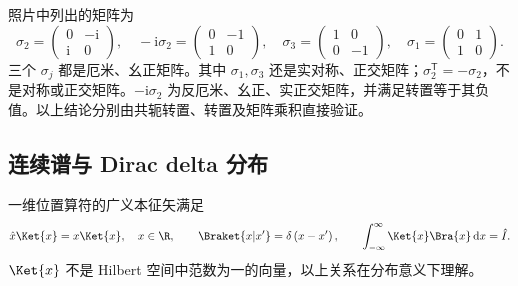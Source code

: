 \begin{example}[课堂矩阵性质辨认]
照片中列出的矩阵为
\begin{equation}
\sigma_2=\left(\begin{matrix}0&-\mathrm{i}\\\mathrm{i}&0\end{matrix}\right),\quad
-\mathrm{i}\sigma_2=\left(\begin{matrix}0&-1\\1&0\end{matrix}\right),\quad
\sigma_3=\left(\begin{matrix}1&0\\0&-1\end{matrix}\right),\quad
\sigma_1=\left(\begin{matrix}0&1\\1&0\end{matrix}\right).
\end{equation}
三个 $\sigma_j$ 都是厄米、幺正矩阵。其中 $\sigma_1,\sigma_3$ 还是实对称、正交矩阵；$\sigma_2^{\mathsf T}=-\sigma_2$，不是对称或正交矩阵。$-\mathrm{i}\sigma_2$ 为反厄米、幺正、实正交矩阵，并满足转置等于其负值。以上结论分别由共轭转置、转置及矩阵乘积直接验证。
\end{example}

\subsection{连续谱与 Dirac delta 分布}
一维位置算符的广义本征矢满足
\begin{equation}
\hat x\Ket{x}=x\Ket{x},\quad x\in\R,\qquad
\Braket{x|x'}=\delta\left(x-x'\right),\qquad
\int_{-\infty}^{\infty}\Ket{x}\Bra{x}\,\mathrm{d}x=\hat I.
\label{eq:xcomplete}
\end{equation}
$\Ket{x}$ 不是 Hilbert 空间中范数为一的向量，以上关系在分布意义下理解。

